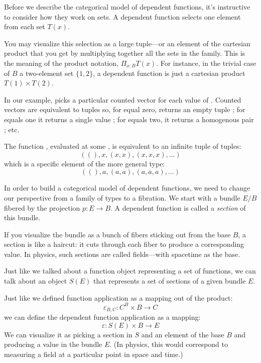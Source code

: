 \documentclass[DaoFP]{subfiles}
\begin{document}
Before we describe the categorical model of dependent functions, it's instructive to consider how they work on sets. A dependent function selects one element from each set $T(x)$. 

You may visualize this selection as a large tuple---or an element of the cartesian product that you get by multiplying together all the sets in the family. This is the meaning of the product notation, $\Pi_{x:B} T(x)$. For instance, in the trivial case of $B$ a two-element set $\{1, 2\}$, a dependent function is just a cartesian product $T(1) \times T(2)$. 

In our example,  picks a particular counted vector for each value of . Counted vectors are equivalent to tuples so, for  equal zero,  returns an empty tuple \hask{()}; for  equals one it returns a single value ; for  equals two, it returns a homogenous pair ; etc. 

The function , evaluated at some ,  is equivalent to an infinite tuple of tuples:
\[ ((), x, (x, x), (x, x, x), ...) \]
which is a specific element of the more general type:
\[ ((), a, (a, a), (a, a, a), ...) \]

In order to build a categorical model of dependent functions, we need to change our perspective from a family of types to a fibration. We start with a bundle $E/B$ fibered by the projection $p\colon E \to B$. A dependent function is called a \emph{section} of this bundle. 

If you visualize the bundle as a bunch of fibers sticking out from the base $B$, a section is like a haircut: it cuts through each fiber to produce a corresponding value. In physics, such sections are called fields---with spacetime as the base. 

Just like we talked about a function object representing a set of functions, we can talk about an object $S(E)$ that represents a set of sections of a given bundle $E$. 

Just like we defined function application as a mapping out of the product:
\[\varepsilon_{B, C} \colon C^B \times B \to C\]
we can define the dependent function application as a mapping:
\[\varepsilon \colon S(E) \times B \to E\]
We can visualize it as picking a section in $S$ and an element of the base $B$ and producing a value in the bundle $E$. (In physics, this would correspond to measuring a field at a particular point in space and time.)
\end{document}
